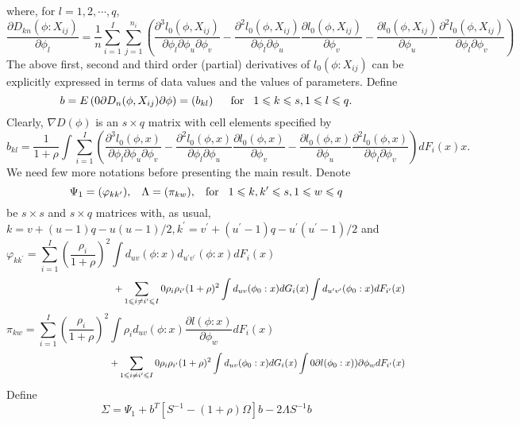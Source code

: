 \documentclass[11pt]{article}
\def\le{\leqslant}
\theoremstyle{plain}
\theoremstyle{definition}
\theoremstyle{remark}
\theoremstyle{definition}
\begin{document}
\noindent where, for $l=1, 2, \cdots, q$,
$$
\frac{\partial D_{kn}(\phi: X_{ij})}{\partial \phi_l}=\frac{1}{n}\sum_{i=1}^I\sum_{j=1}^{n_i}\left( \frac{\partial^3l_0(\phi, X_{ij})}{\partial \phi_l\partial \phi_u\partial \phi_v }-
\frac{\partial^2l_0(\phi, X_{ij})}{\partial \phi_l\partial \phi_u}\frac{\partial l_0(\phi, X_{ij})}{\partial \phi_v} - \frac{\partial l_0(\phi, X_{ij})}{\partial \phi_u}\frac{\partial^2l_0(\phi, X_{ij})}{\partial \phi_l\partial \phi_v}\right)
$$
The above first, second and third order (partial) derivatives of $l_0(\phi: X_{ij})$ can be explicitly expressed in terms of data values and the values of parameters. Define
\begin{equation}
b= E\left( \frac{\partial D_{n}(\phi,X_{ij})}{\partial \phi}\right)=\left( b_{kl} \right)\hspace{5mm}\mbox{for}\hspace{3mm} 1\le k \le s, 1 \le l \le q.
\end{equation}
\noindent Clearly, $\nabla D(\phi)$ is an $s\times q$ matrix with cell elements specified by
$$
b_{kl}=\frac{1}{1+\rho}\int\sum_{i=1}^I\left( \frac{\partial^3l_0(\phi, x)}{\partial \phi_l\partial \phi_u\partial \phi_v }-\frac{\partial^2l_0(\phi, x)}{\partial \phi_l\partial \phi_u}\frac{\partial l_0(\phi, x)}{\partial \phi_v} - \frac{\partial l_0(\phi, x)}{\partial \phi_u}\frac{\partial^2l_0(\phi, x)}{\partial \phi_l\partial \phi_v}\right)dF_i(x)x.
$$
We need few more notations before presenting the main result. Denote
$$\Psi_1=(\varphi_{kk^\prime}), \hspace{3mm} \Lambda=(\pi_{kw}),\hspace{3mm}\mbox{for}\hspace{3mm} 1\le k, k^\prime \le s, 1 \le w \le q $$
\noindent be $s \times s$ and $s \times q$ matrices with, as usual, $k=v+(u-1)q-u(u-1)/2, k^\prime=v^\prime+(u^\prime-1)q-u^\prime(u^\prime-1)/2$ and
$$
\varphi_{kk^\prime}=\sum_{i=1}^I\left(\frac{\rho_i}{1+\rho}\right)^2\int d_{uv}(\phi:x)d_{u^\prime v^\prime}(\phi: x)dF_i(x)\hspace{2in}
$$
$$
\hspace{1.5in}+\sum_{1 \le i \ne i^\prime \le I}\frac{\rho_i\rho_{i^\prime}}{(1+\rho)^2}\int d_{uv}(\phi_0:x)dG_i(x)\int d_{u^\prime v^\prime}(\phi_0:x)dF_{i^\prime}(x)
$$
$$
\pi_{kw}=\sum_{i=1}^I\left(\frac{\rho_i}{1+\rho}\right)^2\int\rho_id_{uv}(\phi:x)\frac{\partial l(\phi:x)}{\partial \phi_w}dF_i(x)\hspace{2in}
$$
$$
\hspace{1.5in}+\sum_{1 \le i \ne i^\prime \le I}\frac{\rho_i\rho_{i^\prime}}{(1+\rho)^2}\int d_{uv}(\phi_0:x)dG_i(x)\int \frac{\partial l(\phi_0:x))}{\partial \phi_w}dF_{i^\prime}(x)
$$
Define
$$\Sigma=\Psi_1 + b^T[S^{-1}-(1+\rho)\Omega]b-2\Lambda S^{-1}b$$
\end{document}

